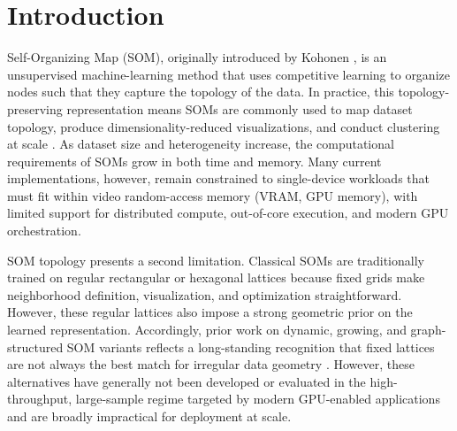 \documentclass[11pt]{article}
\begin{document}
\begin{abstract}
GPU-accelerated Self-Organizing Map (SOM) implementations are among the most competitive options for large-scale SOM analysis, but growing dataset sizes increasingly challenge their practical use because workloads no longer fit cleanly within device-memory limits. We introduce FloatSOM, a SOM framework for scalable training and deployment that supports multi-GPU execution, out-of-memory disk-backed streaming, and scalable training-time graph topologies beyond regular lattices. We evaluate FloatSOM on 14 synthetic and real benchmark datasets together with controlled speed scaling benchmarks, and show that these graph-based topologies, combined with topology-aware hyperparameter fine-tuning, yield lower quantization error than current state-of-the-art SOM baselines. FloatSOM also sustains this performance at large scale with high-throughput distributed execution; in the largest benchmark, it trains a 1024-node SOM network on 1,000,000,000 samples with 50 features in 6.16 minutes on 8 GPUs across two separate high-performance-computing nodes.
\end{abstract}

\section{Introduction}

Self-Organizing Map (SOM), originally introduced by Kohonen \citep{kohonenSelforganizingMap1990}, is an unsupervised machine-learning method that uses competitive learning to organize nodes such that they capture the topology of the data. In practice, this topology-preserving representation means SOMs are commonly used to map dataset topology, produce dimensionality-reduced visualizations, and conduct clustering at scale \citep{kangasVariantsSelforganizingMaps1990}. As dataset size and heterogeneity increase, the computational requirements of SOMs grow in both time and memory. Many current implementations, however, remain constrained to single-device workloads that must fit within video random-access memory (VRAM, GPU memory), with limited support for distributed compute, out-of-core execution, and modern GPU orchestration.

SOM topology presents a second limitation. Classical SOMs are traditionally trained on regular rectangular or hexagonal lattices because fixed grids make neighborhood definition, visualization, and optimization straightforward. However, these regular lattices also impose a strong geometric prior on the learned representation. Accordingly, prior work on dynamic, growing, and graph-structured SOM variants reflects a long-standing recognition that fixed lattices are not always the best match for irregular data geometry \citep{alahakoonDynamicSelforganizingMaps2000,vasighiDirectedBatchGrowing2017,kangasVariantsSelforganizingMaps1990}. However, these alternatives have generally not been developed or evaluated in the high-throughput, large-sample regime targeted by modern GPU-enabled applications and are broadly impractical for deployment at scale.
\end{document}
